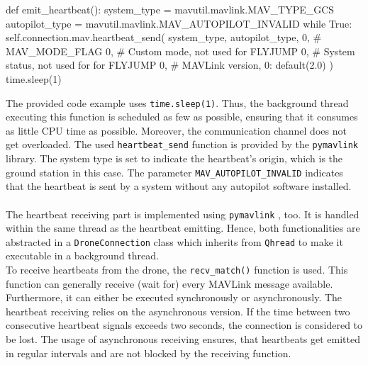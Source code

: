 \begin{pythoncode}[caption=Sending mavlink heartbeats,label=alg:heartbeat_mav_send]
    def emit_heartbeat():
        system_type = mavutil.mavlink.MAV_TYPE_GCS
        autopilot_type = mavutil.mavlink.MAV_AUTOPILOT_INVALID
        while True:
            self.connection.mav.heartbeat_send(
                system_type,
                autopilot_type,
                0,  # MAV_MODE_FLAG
                0,  # Custom mode, not used for FLYJUMP
                0,  # System status, not used for for FLYJUMP
                0,  # MAVLink version, 0: default(2.0)
            )
            time.sleep(1)
\end{pythoncode}
The provided code example uses \texttt{time.sleep(1)}.
Thus, the background thread executing this function is scheduled as few as
possible, ensuring that it consumes as little \ac{CPU} time as possible.
Moreover, the communication channel does not get overloaded.
The used \texttt{heartbeat\_send} function is provided by the
\texttt{pymavlink} library.
The system type is set to indicate the heartbeat's origin, which is the ground
station in this case.
The parameter \texttt{MAV\_AUTOPILOT\_INVALID} indicates that the heartbeat is
sent by a system without any autopilot software installed.\\\\
\noindent The heartbeat receiving part is implemented using \texttt{pymavlink}
, too.
It is handled within the same thread as the heartbeat emitting.
Hence, both functionalities are abstracted in a \texttt{DroneConnection} class
which inherits from \texttt{Qhread} to make it executable in a background
thread.\\
To receive heartbeats from the drone, the \texttt{recv\_match()} function is
used.
This function can generally receive (wait for) every MAVLink message
available.
Furthermore, it can either be executed synchronously or asynchronously.
The heartbeat receiving relies on the asynchronous version.
If the time between two consecutive heartbeat signals exceeds two seconds, the
connection is considered to be lost.
The usage of asynchronous receiving ensures, that heartbeats get emitted in
regular intervals and are not blocked by the receiving function.

